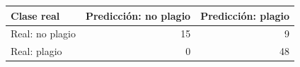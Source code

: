 \begin{tabular}{lrr}
\toprule
Clase real & Predicción: no plagio & Predicción: plagio \\
\midrule
Real: no plagio & 15 & 9 \\
Real: plagio & 0 & 48 \\
\bottomrule
\end{tabular}
